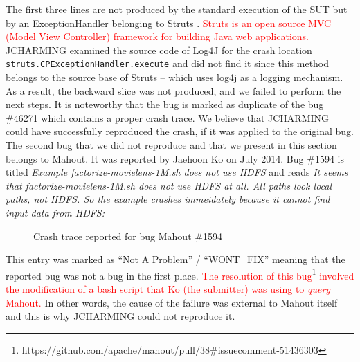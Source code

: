 \documentclass[times, doublespace]{smrauth}
\newcommand{\red}[1]{\textcolor{red}{#1}}
\begin{document}
The first three lines are not produced by the standard
execution of the SUT but by an ExceptionHandler belonging
to Struts \cite{ApacheSoftwareFoundation2000}. \red{Struts is an open source MVC (Model View
Controller) framework for building Java web applications.}
JCHARMING examined the source code of Log4J for the
crash location {\tt struts.CPExceptionHandler.execute} and did not
find it since this method belongs to the source base of Struts
-- which uses log4j as a logging mechanism. As a result, the
backward slice was not produced, and we failed to perform the
next steps. It is noteworthy that the bug is marked as duplicate
of the bug \#46271 which contains a proper crash trace. We
believe that JCHARMING could have successfully
reproduced the crash, if it was applied to the original bug. \\

The second bug that we did not reproduce and
that we present in this section belongs to Mahout. It was reported by
Jaehoon Ko on July 2014. Bug \#1594 is titled {\it Example factorize-movielens-1M.sh does not use HDFS}
and reads {\it It seems that factorize-movielens-1M.sh does not use HDFS at all.
All paths look local paths, not HDFS. So the example crashes
immeidately because it cannot find input data from HDFS: }

\begin{figure}[H]

\noindent{}

\caption{Crash trace reported for bug Mahout \#1594\label{fig:mahout2}}
\end{figure}

This entry was marked as ``Not A Problem'' / ``WONT\_FIX'' meaning that
the reported bug was not a bug in the first place.
\red{The resolution of this bug\footnote{https://github.com/apache/mahout/pull/38\#issuecomment-51436303}
involved the modification of a bash script that Ko (the submitter) was using to {\it query} Mahout.} In other words, the cause of the failure was external to Mahout itself and this is why JCHARMING could not reproduce it.
\end{document}
